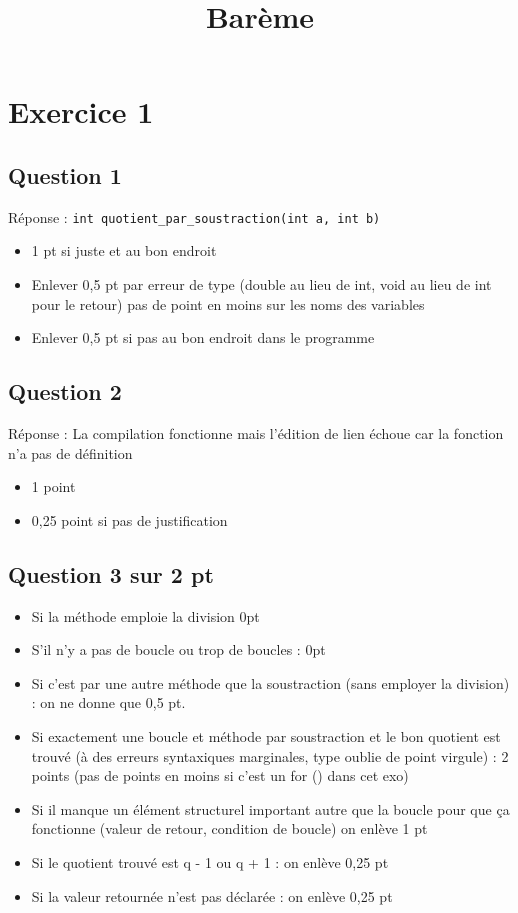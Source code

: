 \documentclass[12pt,a4paper]{article}
\begin{document}
\newcommand{\bexo}[1]{\section*{Exercice #1}}
\newcommand{\bquestion}[1]{\subsection*{Question #1}}
\newcommand{\breponse}[1]{\noindent Réponse : #1}
\newcommand{\bnote}[1]{#1}
\title{Barème}
\bexo{1}
\bquestion{1}
\breponse{}\verb+int quotient_par_soustraction(int a, int b)+

\begin{itemize}
\item 1 pt si juste et au bon endroit

\item Enlever 0,5 pt par
    erreur de type (double au lieu de int, void au lieu de int pour le
    retour) pas de point en moins sur les noms des variables

  \item Enlever 0,5 pt
    si pas au bon endroit dans le programme
\end{itemize}


\bquestion{2}
\breponse{La compilation fonctionne mais l'édition de lien échoue car la fonction \C{quotient...} n'a pas de définition}

\begin{itemize} 
\item \bnote{1 point} 

\item \bnote{0,25 point si pas de
    justification} 
\end{itemize}

\bquestion{3 sur 2 pt}
\begin{itemize}
\item \bnote{Si la méthode emploie la division 0pt}
\item \bnote{S'il n'y a pas de boucle ou trop de boucles : 0pt}
\item \bnote{Si c'est par une autre méthode que la soustraction (sans employer la division) : on ne donne que 0,5 pt.}
\item \bnote{Si exactement une boucle et méthode par soustraction et le bon quotient est trouvé (à des erreurs syntaxiques marginales, type oublie de point virgule) : 2 points  (pas de points en moins si c'est un for () dans cet exo)}
\item \bnote{Si il manque un élément structurel important autre que la boucle pour que ça fonctionne (valeur de retour, condition de boucle) on enlève 1 pt}
\item \bnote{Si le quotient trouvé est q - 1 ou q + 1 : on enlève 0,25 pt}
\item \bnote{Si la valeur retournée n'est pas déclarée : on enlève 0,25 pt}
\end{itemize}
\end{document}
